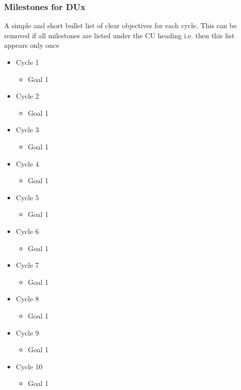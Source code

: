 \documentclass[DM,lsstdraft,SDP]{lsstdoc}
\begin{document}
\subsubsection{Milestones for DUx \label{sect:milestones}}
A simple and short bullet list of clear objectives for each cycle.
This can be removed if all milestones are listed under the CU heading
i.e. then this list appears only once
\begin{itemize}
  \item Cycle 1
  \begin {itemize}
    \item Goal 1
  \end{itemize}
    \item Cycle 2
  \begin {itemize}
    \item Goal 1
   \end{itemize}
    \item Cycle 3
  \begin {itemize}
    \item Goal 1
  \end{itemize}
    \item Cycle 4
  \begin {itemize}
    \item Goal 1
  \end{itemize}
    \item Cycle 5
  \begin {itemize}
    \item Goal 1
  \end{itemize}
    \item Cycle 6
  \begin {itemize}
    \item Goal 1
  \end{itemize}
    \item Cycle 7
  \begin {itemize}
    \item Goal 1
  \end{itemize}
    \item Cycle 8
  \begin {itemize}
    \item Goal 1
  \end{itemize}
    \item Cycle 9
  \begin {itemize}
    \item Goal 1
  \end{itemize}
    \item Cycle 10
  \begin {itemize}
    \item Goal 1
  \end{itemize}
\end{itemize}
\end{document}
